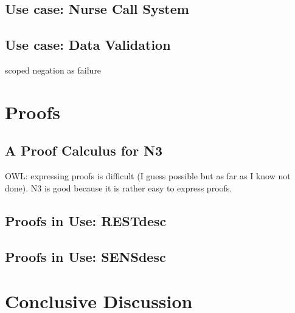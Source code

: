 \documentclass[11pt,a4paper,twoside]{book}
\theoremstyle{remark}
\begin{document}
\chapter{Use case: Nurse Call System}\label{orca}
\chapter{Use case: Data Validation}\label{validation}





scoped negation as failure
\part{Proofs}\label{proof}

\chapter{A Proof Calculus for N3}\label{cal}
OWL: expressing proofs is difficult (I guess possible but as far as I know not done). N3 is good because it is rather  easy to express proofs.
%
%
\chapter{Proofs in Use: RESTdesc}\label{restdesc}
\chapter{Proofs in Use: SENSdesc}\label{sensdesc}




\part{Conclusive Discussion}\label{conclusion}
\end{document}
